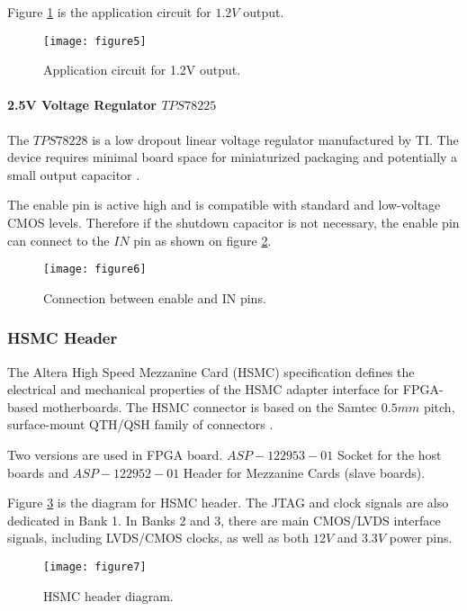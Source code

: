 Figure \ref{fig:b2_f5} is the application circuit for $1.2V$ output.

\begin{figure}
 \centering
 \texttt{[image: figure5]}
 \caption{Application circuit for 1.2V output.}
 \label{fig:b2_f5}
\end{figure}



\paragraph{2.5V Voltage Regulator \texorpdfstring{$TPS78225$}{TPS78225}}
The $TPS78228$ is a low dropout linear voltage regulator manufactured by TI.
The device requires minimal board space for miniaturized packaging and potentially a small output capacitor \citep{TI:2008:TPS782}.

The enable pin is active high and is compatible with standard and low-voltage CMOS levels. Therefore if the shutdown capacitor is not necessary, the enable pin can connect to the $IN$ pin as shown on figure \ref{fig:b2_f6}.

\begin{figure}
 \centering
 \texttt{[image: figure6]}
 \caption{Connection between enable and IN pins.}
 \label{fig:b2_f6}
\end{figure}


\subsubsection{HSMC Header}
The Altera High Speed Mezzanine Card (HSMC) specification defines the electrical
and mechanical properties of the HSMC adapter interface for FPGA-based motherboards.
The HSMC connector is based on the Samtec $0.5mm$ pitch, surface-mount QTH/QSH family of connectors \citep{Altera:2009:HSMCspec}.

Two versions are used in FPGA board. $ASP-122953-01$ Socket for the host boards and $ASP-122952-01$ Header for Mezzanine Cards (slave boards).

Figure \ref{fig:b2_f7} is the diagram for HSMC header.
The JTAG and clock signals are also dedicated in Bank 1. In Banks 2 and 3, there are main CMOS/LVDS interface signals, including LVDS/CMOS clocks, as well as both $12V$ and $3.3V$ power pins.

\begin{figure}
 \centering
 \texttt{[image: figure7]}
 \caption{HSMC header diagram.}
 \label{fig:b2_f7}
\end{figure}


